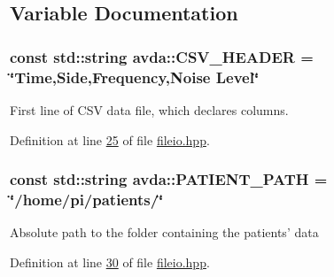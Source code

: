 \subsection{Variable Documentation}
\hypertarget{namespaceavda_ac568a0872c2c176d874b8b12f67f43ea}{
\subsubsection[{C\+S\+V\+\_\+\+H\+E\+A\+D\+E\+R}]{\setlength{\rightskip}{0pt plus 5cm}const std\+::string avda\+::\+C\+S\+V\+\_\+\+H\+E\+A\+D\+E\+R = \char`\"{}Time,{\bf Side},Frequency,Noise Level\char`\"{}}}\label{namespaceavda_ac568a0872c2c176d874b8b12f67f43ea}
First line of C\+S\+V data file, which declares columns. 

Definition at line \hyperlink{fileio_8hpp_source_l00025}{25} of file \hyperlink{fileio_8hpp_source}{fileio.\+hpp}.

\hypertarget{namespaceavda_a8ee73ec0cb55d4a13e89949764dce89d}{
\subsubsection[{P\+A\+T\+I\+E\+N\+T\+\_\+\+P\+A\+T\+H}]{\setlength{\rightskip}{0pt plus 5cm}const std\+::string avda\+::\+P\+A\+T\+I\+E\+N\+T\+\_\+\+P\+A\+T\+H = \char`\"{}/home/pi/patients/\char`\"{}}}\label{namespaceavda_a8ee73ec0cb55d4a13e89949764dce89d}
Absolute path to the folder containing the patients' data 

Definition at line \hyperlink{fileio_8hpp_source_l00030}{30} of file \hyperlink{fileio_8hpp_source}{fileio.\+hpp}.

